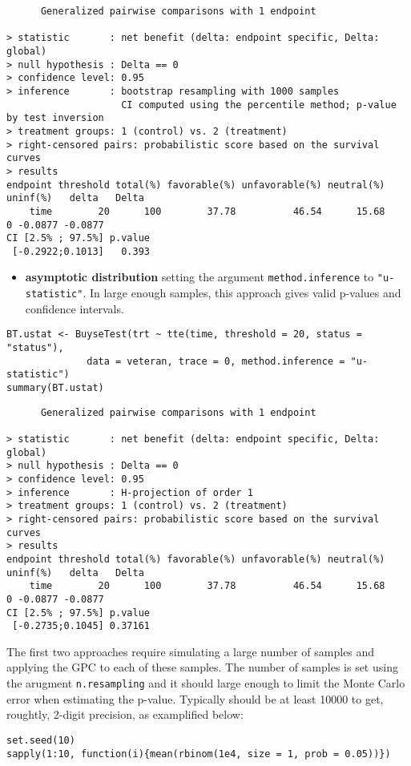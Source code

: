 \documentclass[12pt]{article}
\begin{document}
\begin{verbatim}
      Generalized pairwise comparisons with 1 endpoint

> statistic       : net benefit (delta: endpoint specific, Delta: global) 
> null hypothesis : Delta == 0 
> confidence level: 0.95 
> inference       : bootstrap resampling with 1000 samples 
                    CI computed using the percentile method; p-value by test inversion 
> treatment groups: 1 (control) vs. 2 (treatment) 
> right-censored pairs: probabilistic score based on the survival curves
> results
endpoint threshold total(%) favorable(%) unfavorable(%) neutral(%) uninf(%)   delta   Delta
    time        20      100        37.78          46.54      15.68        0 -0.0877 -0.0877
CI [2.5% ; 97.5%] p.value 
 [-0.2922;0.1013]   0.393
\end{verbatim}

\begin{itemize}
\item \textbf{asymptotic distribution} setting the argument \texttt{method.inference} to
\texttt{"u-statistic"}. In large enough samples, this approach gives valid
p-values and confidence intervals.
\end{itemize}

\lstset{language=r,label= ,caption= ,captionpos=b,numbers=none}
\begin{lstlisting}
BT.ustat <- BuyseTest(trt ~ tte(time, threshold = 20, status = "status"),
		      data = veteran, trace = 0, method.inference = "u-statistic") 
summary(BT.ustat)
\end{lstlisting}

\begin{verbatim}
      Generalized pairwise comparisons with 1 endpoint

> statistic       : net benefit (delta: endpoint specific, Delta: global) 
> null hypothesis : Delta == 0 
> confidence level: 0.95 
> inference       : H-projection of order 1
> treatment groups: 1 (control) vs. 2 (treatment) 
> right-censored pairs: probabilistic score based on the survival curves
> results
endpoint threshold total(%) favorable(%) unfavorable(%) neutral(%) uninf(%)   delta   Delta
    time        20      100        37.78          46.54      15.68        0 -0.0877 -0.0877
CI [2.5% ; 97.5%] p.value 
 [-0.2735;0.1045] 0.37161
\end{verbatim}

The first two approaches require simulating a large number of samples
and applying the GPC to each of these samples. The number of samples
is set using the arugment \texttt{n.resampling} and it should large enough to
limit the Monte Carlo error when estimating the p-value. Typically
should be at least 10000 to get, roughtly, 2-digit precision, as
examplified below:
\lstset{language=r,label= ,caption= ,captionpos=b,numbers=none}
\begin{lstlisting}
set.seed(10)
sapply(1:10, function(i){mean(rbinom(1e4, size = 1, prob = 0.05))})
\end{lstlisting}
\end{document}
